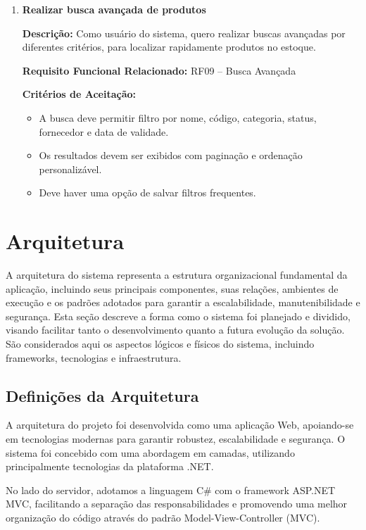 \documentclass[
	12pt,				%
	openright,			%
	twoside,			%
	a4paper,			%
	english,			%
	french,				%
	spanish,			%
	brazil				%
	]{abntex2}
\begin{document}
\begin{enumerate}
\item \textbf{Realizar busca avançada de produtos}

\textbf{Descrição:} Como usuário do sistema, quero realizar buscas avançadas por diferentes critérios, para localizar rapidamente produtos no estoque.

\textbf{Requisito Funcional Relacionado:} RF09 -- Busca Avançada

\textbf{Critérios de Aceitação:}
\begin{itemize}
  \item A busca deve permitir filtro por nome, código, categoria, status, fornecedor e data de validade.
  \item Os resultados devem ser exibidos com paginação e ordenação personalizável.
  \item Deve haver uma opção de salvar filtros frequentes.
\end{itemize}

\end{enumerate}
\section{Arquitetura}

A arquitetura do sistema representa a estrutura organizacional fundamental da aplicação, incluindo seus principais componentes, suas relações, ambientes de execução e os padrões adotados para garantir a escalabilidade, manutenibilidade e segurança. Esta seção descreve a forma como o sistema foi planejado e dividido, visando facilitar tanto o desenvolvimento quanto a futura evolução da solução. São considerados aqui os aspectos lógicos e físicos do sistema, incluindo frameworks, tecnologias e infraestrutura.


\subsection{Definições da Arquitetura}

A arquitetura do projeto foi desenvolvida como uma aplicação Web, apoiando-se em tecnologias modernas para garantir robustez, escalabilidade e segurança. O sistema foi concebido com uma abordagem em camadas, utilizando principalmente tecnologias da plataforma .NET.

No lado do servidor, adotamos a linguagem C\# com o framework ASP.NET MVC, facilitando a separação das responsabilidades e promovendo uma melhor organização do código através do padrão Model-View-Controller (MVC).
\end{document}
